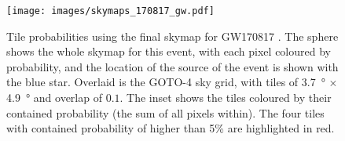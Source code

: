 \begin{colsection}
\begin{colsection}
\begin{figure}[p]
    \begin{center}
        \texttt{[image: images/skymaps\_170817\_gw.pdf]}
    \end{center}
    \caption[Tile probabilities for GW170817]{
        Tile probabilities using the final skymap for GW170817 \citep{GW170817}. The sphere shows the whole skymap for this event, with each pixel coloured by probability, and the location of the source of the event is shown with the blue star. Overlaid is the GOTO-4 sky grid, with tiles of \SI{3.7}{\degree} $\times$ \SI{4.9}{\degree} and overlap of $0.1$. The inset shows the tiles coloured by their contained probability (the sum of all pixels within). The four tiles with contained probability of higher than 5\% are highlighted in red.
    }\label{fig:170817_gw}
\end{figure}

\clearpage

\end{colsection}


\end{colsection}


\newpage
